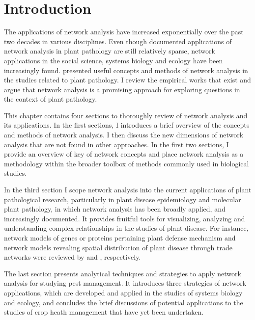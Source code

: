 \section*{Introduction}
\label{ch:intro}

The applications of network analysis have increased exponentially over the past two decades in various disciplines. Even though documented applications of network analysis in plant pathology are still relatively sparse, network applications in the social science, systems biology and ecology have been increasingly found.  presented useful concepts and methods of network analysis in the studies related to plant pathology. I review the empirical works that exist and argue that network analysis is a promising approach for exploring questions in the context of plant pathology.

% 
This chapter contains four sections to thoroughly review of network analysis and its applications. In the first sections, I introduces a brief overview of the concepts and methods of network analysis. I then discuss the new dimensions of network analysis that are not found in other approaches. In the first two sections, I provide an overview of key of network concepts and place network analysis as a methodology within the broader toolbox of methods commonly used in biological studies.

In the third section I scope network analysis  into the current applications of plant pathological research, particularly in plant disease epidemiology and molecular plant pathology, in which network analysis has been broadly applied, and increasingly documented. It provides fruitful tools for visualizing, analyzing and understanding complex relationships in the studies of plant disease. For instance, network models of genes or proteins pertaining plant defense mechanism and network models revealing spatial distribution of plant disease through trade networks were reviewed by  and , respectively. 

The last section presents analytical techniques and strategies to apply network analysis for studying pest management. It introduces three strategies of network applications, which are developed and applied in the studies of systems biology and ecology, and concludes the brief discussions of potential applications to the studies of crop heath management that have yet been undertaken.

